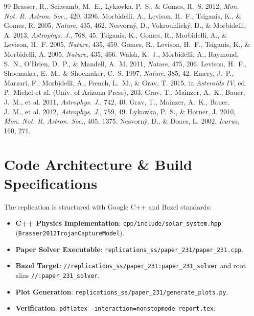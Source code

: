 \documentclass[11pt,a4paper]{article}
\begin{document}
\begin{thebibliography}{99}
 Brasser, R., Schwamb, M.~E., Lykawka, P.~S., \& Gomes, R.~S. 2012, \textit{Mon. Not. R. Astron. Soc.}, 420, 3396.
 Morbidelli, A., Levison, H.~F., Tsiganis, K., \& Gomes, R. 2005, \textit{Nature}, 435, 462.
 Nesvorn{\'y}, D., Vokrouhlick{\'y}, D., \& Morbidelli, A. 2013, \textit{Astrophys. J.}, 768, 45.
 Tsiganis, K., Gomes, R., Morbidelli, A., \& Levison, H.~F. 2005, \textit{Nature}, 435, 459.
 Gomes, R., Levison, H.~F., Tsiganis, K., \& Morbidelli, A. 2005, \textit{Nature}, 435, 466.
 Walsh, K.~J., Morbidelli, A., Raymond, S.~N., O'Brien, D.~P., \& Mandell, A.~M. 2011, \textit{Nature}, 475, 206.
 Levison, H.~F., Shoemaker, E.~M., \& Shoemaker, C.~S. 1997, \textit{Nature}, 385, 42.
 Emery, J.~P., Marzari, F., Morbidelli, A., French, L.~M., \& Grav, T. 2015, in \textit{Asteroids IV}, ed. P.~Michel et al. (Univ. of Arizona Press), 203.
 Grav, T., Mainzer, A.~K., Bauer, J.~M., et al. 2011, \textit{Astrophys. J.}, 742, 40.
 Grav, T., Mainzer, A.~K., Bauer, J.~M., et al. 2012, \textit{Astrophys. J.}, 759, 49.
 Lykawka, P.~S., \& Horner, J. 2010, \textit{Mon. Not. R. Astron. Soc.}, 405, 1375.
 Nesvorn{\'y}, D., \& Dones, L. 2002, \textit{Icarus}, 160, 271.
\end{thebibliography}

\appendix
\section{Code Architecture \& Build Specifications}
The replication is structured with Google C++ and Bazel standards:
\begin{itemize}
    \item \textbf{C++ Physics Implementation}: \texttt{cpp/include/solar\_system.hpp} (\texttt{Brasser2012TrojanCaptureModel}).
    \item \textbf{Paper Solver Executable}: \texttt{replications\_ss/paper\_231/paper\_231.cpp}.
    \item \textbf{Bazel Target}: \texttt{//replications\_ss/paper\_231:paper\_231\_solver} and root alias \texttt{//:paper\_231\_solver}.
    \item \textbf{Plot Generation}: \texttt{replications\_ss/paper\_231/generate\_plots.py}.
    \item \textbf{Verification}: \texttt{pdflatex -interaction=nonstopmode report.tex}.
\end{itemize}
\end{document}
